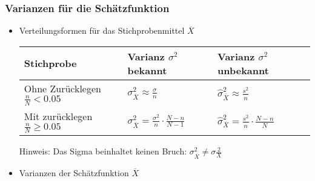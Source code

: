 \subsubsection{Varianzen für die Schätzfunktion}
\begin{itemize}
\item Verteilungsformen für das Stichprobenmittel $\overline{X}$
\begin{table}[H]
\centering
\begin{tabular}{@{}lll@{}}
\toprule
Stichprobe & Varianz $\sigma^2$ bekannt & Varianz $\sigma^2$ unbekannt \\ \midrule
Ohne Zurücklegen $\frac{n}{N}<0.05$ & $\displaystyle\sigma_{\overline{X}}^2\approx\frac{\sigma}{n}$ & $\displaystyle\widehat{\sigma}_{\overline{X}}^2\approx\frac{s^2}{n}$ \\ 
Mit zurücklegen $\frac{n}{N} \geq 0.05$ & $\displaystyle\sigma_{\overline{X}}^2=\frac{\sigma^2}{n}\cdot\frac{N-n}{N-1}$ & $\displaystyle\widehat{\sigma}_{\overline{X}}^2 =\frac{s^2}{n}\cdot\frac{N-n}{N}$ \\ \bottomrule
\end{tabular}
\end{table}
Hinweis: Das Sigma beinhaltet keinen Bruch: $\sigma_{\overline{X}}^2 \neq \sigma\frac{2}{X}$
\pagebreak[4]
\item Varianzen der Schätzfunktion $\overline{X}$

\end{itemize}
